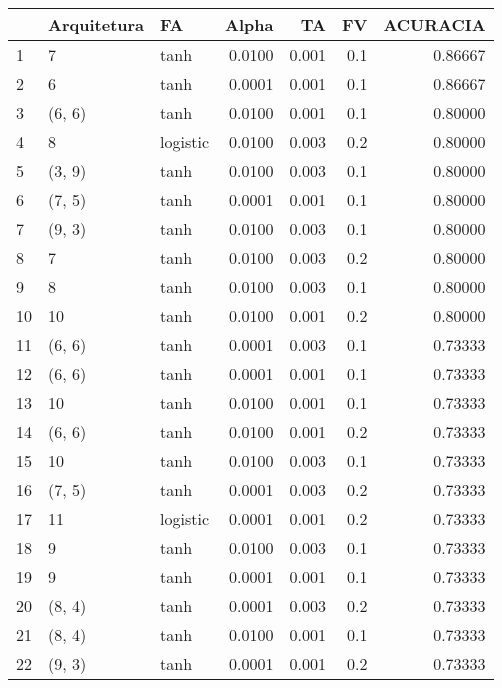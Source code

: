 \begin{tabular}{lllrrrr}
\toprule
{} & Arquitetura &        FA &   Alpha &     TA &   FV &  ACURACIA \\
\midrule
1   &           7 &      tanh &  0.0100 &  0.001 &  0.1 &   0.86667 \\
2   &           6 &      tanh &  0.0001 &  0.001 &  0.1 &   0.86667 \\
3   &      (6, 6) &      tanh &  0.0100 &  0.001 &  0.1 &   0.80000 \\
4   &           8 &  logistic &  0.0100 &  0.003 &  0.2 &   0.80000 \\
5   &      (3, 9) &      tanh &  0.0100 &  0.003 &  0.1 &   0.80000 \\
6   &      (7, 5) &      tanh &  0.0001 &  0.001 &  0.1 &   0.80000 \\
7   &      (9, 3) &      tanh &  0.0100 &  0.003 &  0.1 &   0.80000 \\
8   &           7 &      tanh &  0.0100 &  0.003 &  0.2 &   0.80000 \\
9   &           8 &      tanh &  0.0100 &  0.003 &  0.1 &   0.80000 \\
10  &          10 &      tanh &  0.0100 &  0.001 &  0.2 &   0.80000 \\
11  &      (6, 6) &      tanh &  0.0001 &  0.003 &  0.1 &   0.73333 \\
12  &      (6, 6) &      tanh &  0.0001 &  0.001 &  0.1 &   0.73333 \\
13  &          10 &      tanh &  0.0100 &  0.001 &  0.1 &   0.73333 \\
14  &      (6, 6) &      tanh &  0.0100 &  0.001 &  0.2 &   0.73333 \\
15  &          10 &      tanh &  0.0100 &  0.003 &  0.1 &   0.73333 \\
16  &      (7, 5) &      tanh &  0.0001 &  0.003 &  0.2 &   0.73333 \\
17  &          11 &  logistic &  0.0001 &  0.001 &  0.2 &   0.73333 \\
18  &           9 &      tanh &  0.0100 &  0.003 &  0.1 &   0.73333 \\
19  &           9 &      tanh &  0.0001 &  0.001 &  0.1 &   0.73333 \\
20  &      (8, 4) &      tanh &  0.0001 &  0.003 &  0.2 &   0.73333 \\
21  &      (8, 4) &      tanh &  0.0100 &  0.001 &  0.1 &   0.73333 \\
22  &      (9, 3) &      tanh &  0.0001 &  0.001 &  0.2 &   0.73333 \\

\end{tabular}
